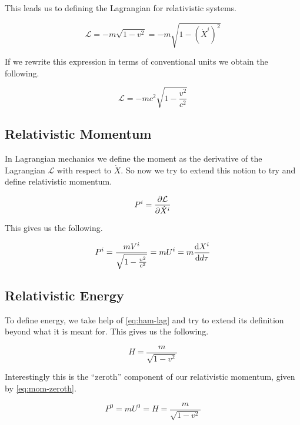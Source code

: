 \documentclass[16pt]{scrartcl}
\numberwithin{equation}{section}
\theoremstyle{plain}
\theoremstyle{definition}
\begin{document}
This leads us to defining the Lagrangian for relativistic systems.

\begin{equation}
    \mathcal{L} = -m \sqrt{1 - v^2} = -m \sqrt{1 - (\dot X^i)^2} 
    \label{eq:rel-lagrangian}
\end{equation}

If we rewrite this expression in terms of conventional units we obtain the following.

\begin{equation}
    \mathcal{L} = -mc^2 \sqrt{1 - \frac{v^2}{c^2}}
    \label{eq:rel-lag-conventional}
\end{equation}

\subsection{Relativistic Momentum}

In Lagrangian mechanics we define the moment as the derivative of the Lagrangian $\mathcal{L}$ with respect to $\dot X$. So now we try to extend this notion to try and define relativistic momentum.

\begin{equation}
    P^i = \pdv{\mathcal{L}}{\dot X^i}
    \label{eq:rel-momentum}
\end{equation}

This gives us the following.

\begin{equation}
    P^i = \frac{mV^i}{\sqrt{1- \frac{v^2}{c^2}}} = mU^i = m \dv{X^i}{d\tau}
    \label{eq:rel-momentum-2}
\end{equation}

\subsection{Relativistic Energy}

To define energy, we take help of \eqref{eq:ham-lag} and try to extend its definition beyond what it is meant for. This gives us the following.

\begin{equation}
    H = \frac{m}{\sqrt{1-v^2}}
    \label{eq:rel-energy}
\end{equation}

Interestingly this is the ``zeroth'' component of our relativistic momentum, given by \eqref{eq:mom-zeroth}.

\begin{equation}
    P^0 = mU^0 = H = \frac{m}{\sqrt{1-v^2}} 
    \label{eq:mom-zeroth}
\end{equation}
 
\end{document}
